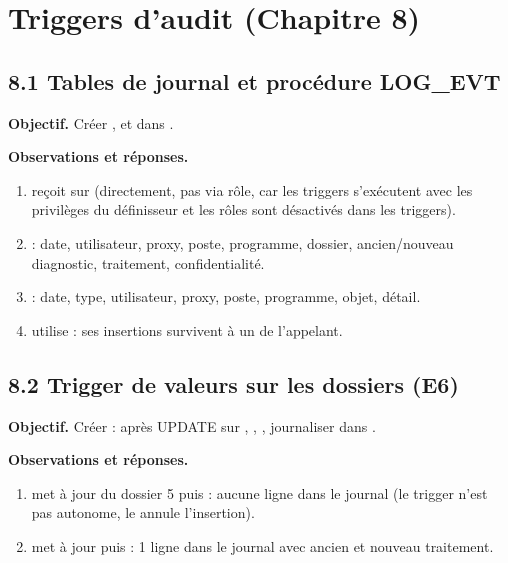 \section{Triggers d'audit (Chapitre 8)}

\subsection{8.1 Tables de journal et procédure LOG\_EVT}
\textbf{Objectif.} Créer ,  et  dans .


\textbf{Observations et réponses.}
\begin{enumerate}
  \item {} reçoit  sur  (directement, pas via rôle, car les triggers s'exécutent avec les privilèges du définisseur et les rôles sont désactivés dans les triggers).
  \item {} : date, utilisateur, proxy, poste, programme, dossier, ancien/nouveau diagnostic, traitement, confidentialité.
  \item {} : date, type, utilisateur, proxy, poste, programme, objet, détail.
  \item {} utilise  : ses insertions survivent à un  de l'appelant.
\end{enumerate}

\subsection{8.2 Trigger de valeurs sur les dossiers (E6)}
\textbf{Objectif.} Créer  : après UPDATE sur , , , journaliser dans .


\textbf{Observations et réponses.}
\begin{enumerate}
  \item {} met à jour  du dossier 5 puis  : aucune ligne dans le journal (le trigger n'est pas autonome, le  annule l'insertion).
  \item {} met à jour puis  : 1 ligne dans le journal avec ancien et nouveau traitement.
\end{enumerate}

